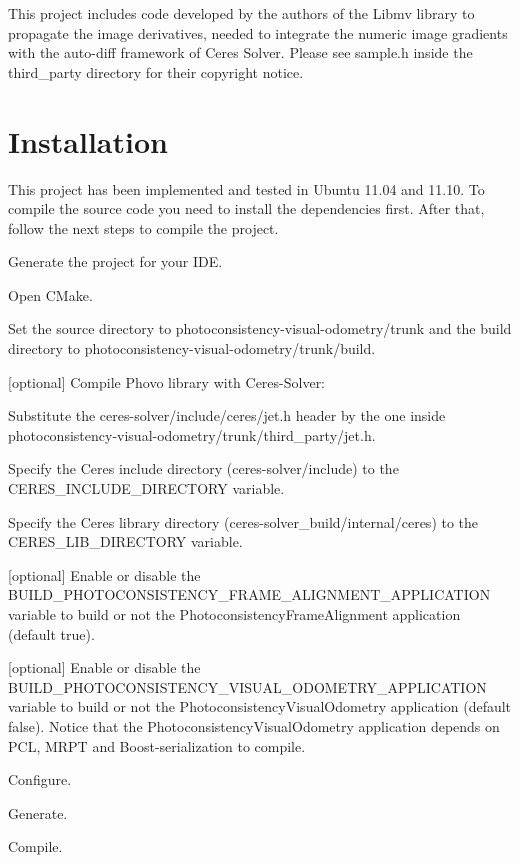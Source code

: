 This project includes code developed by the authors of the Libmv library to propagate the image derivatives, needed to integrate the numeric image gradients with the auto-\/diff framework of Ceres Solver. Please see sample.h inside the third\_\-party directory for their copyright notice.\hypertarget{index_install_sec}{}\section{Installation}\label{index_install_sec}
This project has been implemented and tested in Ubuntu 11.04 and 11.10. To compile the source code you need to install the dependencies first. After that, follow the next steps to compile the project.


\begin{DoxyItemize}
\item Generate the project for your IDE.
\begin{DoxyItemize}
\item Open CMake.
\item Set the source directory to photoconsistency-\/visual-\/odometry/trunk and the build directory to photoconsistency-\/visual-\/odometry/trunk/build.
\item \mbox{[}optional\mbox{]} Compile Phovo library with Ceres-\/Solver:
\begin{DoxyItemize}
\item Substitute the ceres-\/solver/include/ceres/jet.h header by the one inside photoconsistency-\/visual-\/odometry/trunk/third\_\-party/jet.h.
\item Specify the Ceres include directory (ceres-\/solver/include) to the CERES\_\-INCLUDE\_\-DIRECTORY variable.
\item Specify the Ceres library directory (ceres-\/solver\_\-build/internal/ceres) to the CERES\_\-LIB\_\-DIRECTORY variable.
\end{DoxyItemize}
\item \mbox{[}optional\mbox{]} Enable or disable the BUILD\_\-PHOTOCONSISTENCY\_\-FRAME\_\-ALIGNMENT\_\-APPLICATION variable to build or not the PhotoconsistencyFrameAlignment application (default true).
\item \mbox{[}optional\mbox{]} Enable or disable the BUILD\_\-PHOTOCONSISTENCY\_\-VISUAL\_\-ODOMETRY\_\-APPLICATION variable to build or not the PhotoconsistencyVisualOdometry application (default false). Notice that the PhotoconsistencyVisualOdometry application depends on PCL, MRPT and Boost-\/serialization to compile.
\item Configure.
\item Generate.
\item Compile.
\end{DoxyItemize}
\end{DoxyItemize}


